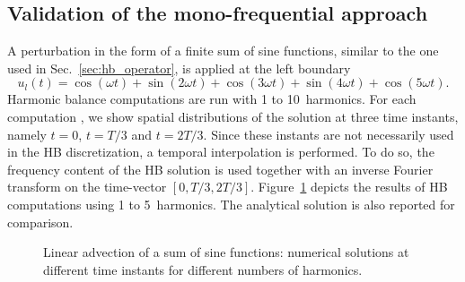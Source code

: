 
\subsection{Validation of the mono-frequential approach}
\label{sec:sum_sine}

A perturbation 
in the form of a finite sum of sine functions, similar to the one used
in Sec.~\ref{sec:hb_operator},
is applied at the left boundary
\begin{equation}
    u_l(t) = \cos(\omega t) + \sin(2 \omega t) +
    \cos(3 \omega t) + \sin(4 \omega t) + \cos(5 \omega t).
    \label{eq:sum_injected_fct}
\end{equation}
Harmonic balance computations are run with 1 to 10~harmonics.
For each computation , 
we show spatial distributions of the solution
at three time instants, namely $t=0$, $t=T/3$ and $t=2T/3$.
Since these instants are not necessarily used in the HB discretization,
a temporal interpolation is performed.
To do so, the frequency content of the HB solution is used
together with an inverse Fourier transform on the time-vector
$[0, T/3, 2T/3]$.
Figure~\ref{fig:inj_sine_results} depicts the results of HB computations
using 1 to 5~harmonics. The analytical solution is also reported for comparison.
\begin{figure}[htp]
  \centering
  \caption{Linear advection of a sum of sine functions: 
  numerical solutions at different time instants for different numbers of harmonics.}
  \label{fig:inj_sine_results}
\end{figure}

